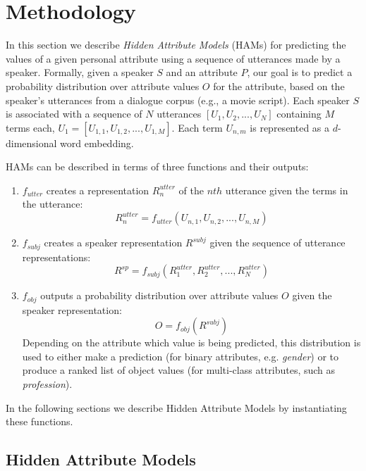 \section{Methodology}
\label{sec:method}

In this section we describe \textit{Hidden Attribute Models} (HAMs) 
for predicting the values of a given personal attribute using a sequence of utterances made by a speaker.
Formally, given a speaker $S$ and an attribute $P$, our goal is to predict a probability distribution over attribute values $O$ for the attribute, based on the speaker's utterances from a dialogue corpus (e.g., a movie script). Each speaker $S$ is associated with a sequence of $N$ utterances $[U_{1}, U_{2}, ..., U_{N}]$ containing $M$ terms each, $U_1 = [U_{1,1}, U_{1,2}, ..., U_{1,M}]$. Each term $U_{n,m}$ is represented as a $d$-dimensional word embedding.

HAMs
can be described in terms of three functions and their outputs:
\begin{enumerate}
\item $f_{utter}$ creates a representation $R^{utter}_n$  of the $nth$ utterance given the terms in the utterance:
\begin{equation}
R^{utter}_n = f_{utter}(U_{n,1}, U_{n,2}, ..., U_{n,M})
\end{equation}
\item $f_{subj}$ creates a speaker representation $R^{subj}$ given the sequence of utterance representations:
\begin{equation}
R^{sp} = f_{subj}(R^{utter}_1, R^{utter}_2, ..., R^{utter}_N)
\end{equation}
\item $f_{obj}$ outputs a probability distribution over attribute values $O$ given the speaker representation:
\begin{equation}
O = f_{obj}(R^{subj})
\end{equation}
Depending on the attribute which value is being predicted, this distribution is used to either make a prediction (for binary attributes, e.g. \textit{gender}) or to produce a ranked list of object values (for multi-class attributes, such as \textit{profession}).
\end{enumerate}

\noindent
In the following sections we describe Hidden Attribute Models by instantiating these functions.

\subsection{Hidden Attribute Models}

